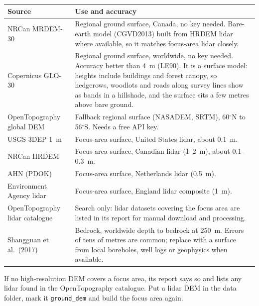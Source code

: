         \begin{tabular}{p{}p{}}
        \hline
        Source & Use and accuracy \\
        \hline
        NRCan MRDEM-30 & Regional ground surface, Canada, no key needed.  Bare-earth model (CGVD2013) built from HRDEM lidar where available, so it matches focus-area lidar closely. \\
        Copernicus GLO-30 & Regional ground surface, worldwide, no key needed.  Accuracy better than 4~m (LE90).  It is a surface model: heights include buildings and forest canopy, so hedgerows, woodlots and roads along survey lines show as bands in a hillshade, and the surface sits a few metres above bare ground. \\
        OpenTopography global DEM & Fallback regional surface (NASADEM, SRTM), 60$^\circ$N to 56$^\circ$S.  Needs a free API key. \\
        USGS 3DEP 1~m & Focus-area surface, United States lidar, about 0.1~m. \\
        NRCan HRDEM & Focus-area surface, Canadian lidar (1--2~m), about 0.1--0.3~m. \\
        AHN (PDOK) & Focus-area surface, Netherlands lidar (0.5~m). \\
        Environment Agency lidar & Focus-area surface, England lidar composite (1~m). \\
        OpenTopography lidar catalogue & Search only: lidar datasets covering the focus area are listed in its report for manual download and processing. \\
        Shangguan et al.\ (2017) & Bedrock, worldwide depth to bedrock at 250~m.  Errors of tens of metres are common; replace with a surface from local boreholes, well logs or geophysics when available. \\
        \hline
        \end{tabular}

        \medskip
        If no high-resolution DEM covers a focus area, its report says so and lists any lidar found in the OpenTopography catalogue.  Put a lidar DEM in the data folder, mark it {\tt ground\_dem} and build the focus area again.

